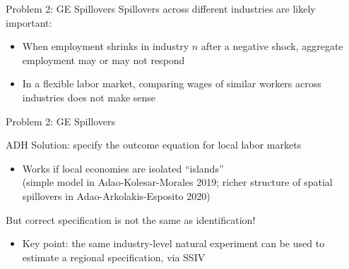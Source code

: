 \documentclass[t]{beamer}
\begin{document}
\begin{frame}{Problem 2: GE Spillovers}
\vspace{-0.2cm}
Spillovers across different industries are likely important:
	\begin{itemize}
	\item When employment  shrinks in industry $n$ after a negative shock, aggregate employment may or may not respond
	\pause\smallskip
	\item In a flexible labor market, comparing wages of similar workers across industries does not make sense
	\end{itemize}

\end{frame}

\begin{frame}{Problem 2: GE Spillovers}

ADH Solution: specify the outcome equation for local labor markets 
\begin{itemize}
\item Works if local economies are isolated ``islands'' \\(simple model in Adao-Kolesar-Morales 2019; richer structure of spatial spillovers in Adao-Arkolakis-Esposito 2020)
\pause\medskip
\end{itemize}

But correct specification is not the same as identification!
	\begin{itemize}
	\item Key point: the same industry-level natural experiment can be used to estimate a regional specification, via SSIV
	\end{itemize}
\end{frame}
\end{document}
